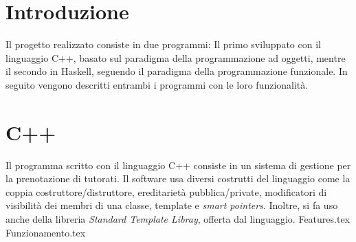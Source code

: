 \documentclass[
	a4paper,
	cleardoublepage=empty,
	headings=twolinechapter,
	numbers=autoenddot,
]{scrbook}
\begin{document}
	\frontmatter
	
	\begin{frontespizio}
		\Margini{3cm}{3cm}{3cm}{3cm}
		\Punteggiatura{}
		\begin{Preambolo*}
			\usepackage[italian]{babel}
			\usepackage[T1]{fontenc}
			\usepackage[utf8]{inputenc}
			\usepackage{microtype}
			\usepackage{lmodern}
			\graphicspath{{img/}}
			
			\renewcommand{\frontinstitutionfont}{\fontsize{14}{17}\bfseries\scshape}
			\renewcommand{\fronttitlefont}{\fontsize{17}{21}\bfseries\scshape}
			\renewcommand{\frontfootfont}{\fontsize{12}{14}\bfseries\scshape}
		\end{Preambolo*}
	\end{frontespizio}
	
	\tableofcontents
	\listoffigures
	\mainmatter
	
	\chapter*{Introduzione}
	Il progetto realizzato consiste in due programmi: Il primo sviluppato con il linguaggio C++, basato sul paradigma della programmazione ad oggetti, mentre il secondo in Haskell, seguendo il paradigma della programmazione funzionale. In seguito vengono descritti entrambi i programmi con le loro funzionalità.
	
	\chapter{C++}
	Il programma scritto con il linguaggio C++ consiste in un sistema di gestione per la prenotazione di tutorati. Il software usa diversi costrutti del linguaggio come la coppia costruttore/distruttore, ereditarietà pubblica/private, modificatori di visibilità dei membri di una classe, template e \textit{smart pointers}. Inoltre, si fa uso anche della libreria \textit{Standard Template Libray}, offerta dal linguaggio.
	{Features.tex}
	{Funzionamento.tex}
\end{document}
